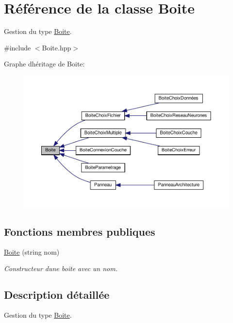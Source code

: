 \hypertarget{class_boite}{}\section{Référence de la classe Boite}
\label{class_boite}


Gestion du type \hyperlink{class_boite}{Boite}.  




{\ttfamily \#include $<$Boite.\+hpp$>$}



Graphe d\textquotesingle{}héritage de Boite\+:\nopagebreak
\begin{figure}[H]
\begin{center}
\leavevmode
\includegraphics[width=350pt]{class_boite__inherit__graph}
\end{center}
\end{figure}
\subsection*{Fonctions membres publiques}
\begin{DoxyCompactItemize}
\item 
\mbox{\label{class_boite_abb48ea45974db03f2c1793a7db214d82}} 
\hyperlink{class_boite_abb48ea45974db03f2c1793a7db214d82}{Boite} (string nom)
\begin{DoxyCompactList}\small\item\em Constructeur d\textquotesingle{}une boite avec un nom. \end{DoxyCompactList}\end{DoxyCompactItemize}


\subsection{Description détaillée}
Gestion du type \hyperlink{class_boite}{Boite}. 

